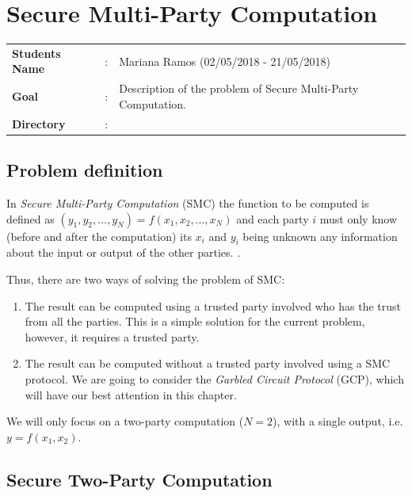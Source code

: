 \clearpage
\section{Secure Multi-Party Computation}

\begin{refsection}

\begin{tcolorbox}	
\begin{tabular}{p{2.75cm} p{0.2cm} p{10.5cm}} 	
\textbf{Students Name}      &:& Mariana Ramos (02/05/2018 - 21/05/2018)\\
\textbf{Goal}               &:& Description of the problem of Secure Multi-Party Computation.\\
\textbf{Directory}          &:& \\
\end{tabular}
\end{tcolorbox}


\subsection{Problem definition}

In \textit{Secure Multi-Party Computation} (SMC) the function to be computed is defined as $(y_1,y_2,...,y_N)=f(x_1,x_2,...,x_N)$ and each party $i$ must only know (before and after the computation) its $x_i$ and $y_i$ being unknown any information about the input or output of the other parties. \cite{Naumann16}.

Thus, there are two ways of solving the problem of SMC:

\begin{enumerate}
  \item The result can be computed using a trusted party involved who has the trust from all the parties. This is a simple solution for the current problem, however, it requires a trusted party.
  \item The result can be computed without a trusted party involved using a SMC protocol. We are going to consider the \textit{Garbled Circuit Protocol} (GCP), which will have our best attention in this chapter.
\end{enumerate}

We will only focus on a two-party computation ($N=2$), with a single output, i.e. $y = f(x_1, x_2)$.

\subsection{Secure Two-Party Computation}


\end{refsection}
